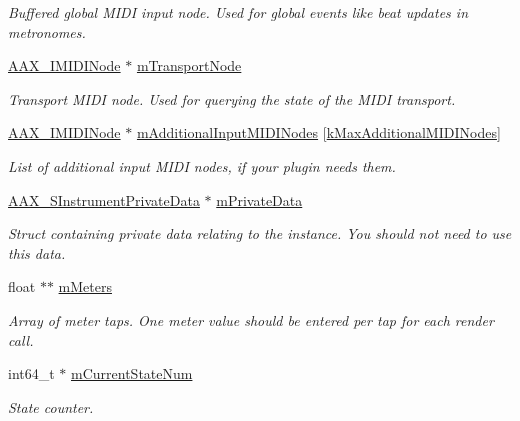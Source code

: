 \begin{DoxyCompactItemize}
\begin{DoxyCompactList}\small\item\em Buffered global M\+I\+DI input node. Used for global events like beat updates in metronomes. \end{DoxyCompactList}\item 
\mbox{\hyperlink{a01845}{A\+A\+X\+\_\+\+I\+M\+I\+D\+I\+Node}} $\ast$ \mbox{\hyperlink{a01965_a60ea39a008cad2ecd97b2251787b3b38}{m\+Transport\+Node}}
\begin{DoxyCompactList}\small\item\em Transport M\+I\+DI node. Used for querying the state of the M\+I\+DI transport. \end{DoxyCompactList}\item 
\mbox{\hyperlink{a01845}{A\+A\+X\+\_\+\+I\+M\+I\+D\+I\+Node}} $\ast$ \mbox{\hyperlink{a01965_ab90074855c83148226feb8a64ac0b354}{m\+Additional\+Input\+M\+I\+D\+I\+Nodes}} \mbox{[}\mbox{\hyperlink{a00746_af66ae5854aedf3b38c6d6540670966b1}{k\+Max\+Additional\+M\+I\+D\+I\+Nodes}}\mbox{]}
\begin{DoxyCompactList}\small\item\em List of additional input M\+I\+DI nodes, if your plugin needs them. \end{DoxyCompactList}\item 
\mbox{\hyperlink{a01961}{A\+A\+X\+\_\+\+S\+Instrument\+Private\+Data}} $\ast$ \mbox{\hyperlink{a01965_aff00dfa131d966478ab571ebcab7a86c}{m\+Private\+Data}}
\begin{DoxyCompactList}\small\item\em Struct containing private data relating to the instance. You should not need to use this data. \end{DoxyCompactList}\item 
float $\ast$$\ast$ \mbox{\hyperlink{a01965_a68ae865355f50537127d3e2e0efd585f}{m\+Meters}}
\begin{DoxyCompactList}\small\item\em Array of meter taps. One meter value should be entered per tap for each render call. \end{DoxyCompactList}\item 
int64\+\_\+t $\ast$ \mbox{\hyperlink{a01965_a846c5f9e518bb66bf1854a9eb77d54a7}{m\+Current\+State\+Num}}
\begin{DoxyCompactList}\small\item\em State counter. \end{DoxyCompactList}\end{DoxyCompactItemize}


